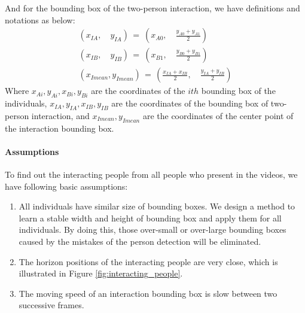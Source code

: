 And for the bounding box of the two-person interaction, we have definitions and notations as below:
\begin{eqnarray}
	(x_{IA}, \quad y_{IA})\,  = \ ({x_{A0}, \quad \frac{y_{A0} + y_{A1}}{2}}) \\
	({x_{IB}, \quad y_{IB}})\,  = \  ({x_{B1}, \quad \frac{y_{B0} + y_{B1}}{2}}) \\
	(x_{Imean}, y_{Imean}) \, = \, (\frac{x_{IA} + x_{IB}}{2}, \quad \frac{y_{IA} + y_{IB}}{2})
\end{eqnarray}
Where \(x_{Ai},y_{Ai},x_{Bi},y_{Bi}\) are the coordinates of the \(ith\) bounding box of the  individuals, \(x_{IA},y_{IA},x_{IB},y_{IB}\) are the coordinates of the bounding box of two-person interaction, and \(x_{Imean},y_{Imean}\) are the coordinates of the center point of the interaction bounding box.

\paragraph*{Assumptions}
To find out the interacting people from all people who present in the videos, we have following basic assumptions: 
\begin{enumerate}
	\item All individuals have similar size of bounding boxes. We design a method to learn a stable width and height of bounding box and apply them for all individuals. By doing this, those over-small or over-large bounding boxes caused by the mistakes of the person detection will be eliminated.
	\item The horizon positions of the interacting people are very close, which is illustrated in Figure \ref{fig:interacting_people}.
	\item The moving speed of an interaction bounding box is slow between two successive frames.
\end{enumerate}

